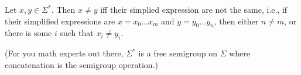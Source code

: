 



\begin{defn}
Let $x,y \in \Sigma^*$. Then $x \neq y$ iff their simplied
expression are not the same, i.e., if their simplified expressions
are $x = x_0\ldots x_m$ and $y=y_0 \ldots y_n$, then either $n
\neq m$, or there is some $i$ such that $x_i \neq y_i$.
\end{defn}


(For you math experts out there, $\Sigma^*$ is a free semigroup on
$\Sigma$ where concatenation is the semigroup operation.)
